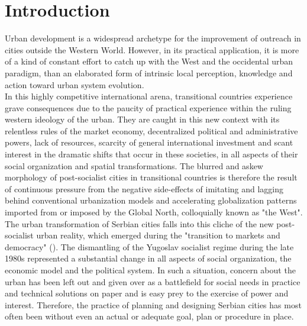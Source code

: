 \documentclass[11pt]{report}
\begin{document}

\chapter{Introduction}

Urban development is a widespread archetype for the improvement of outreach in cities outside the Western World. However, in its practical application, it is more of a kind of constant effort to catch up with the West and the occidental urban paradigm, than an elaborated form of intrinsic local perception, knowledge and action toward urban system evolution. 
\\

In this highly competitive international arena, transitional countries experience grave consequences due to the paucity of practical experience within the ruling western ideology of the urban. They are caught in this new context with its relentless rules of the market economy, decentralized political and administrative powers, lack of resources, scarcity of general international investment and scant interest in the dramatic shifts that occur in these societies, in all aspects of their social organization and spatial transformations. The blurred and askew morphology of post-socialist cities in transitional countries is therefore the result of continuous pressure from the negative side-effects of imitating and lagging behind conventional urbanization models and accelerating globalization patterns imported from or imposed by the Global North, colloquially  known as "the West".
\\

The urban transformation of Serbian cities falls into this cliche of the new post-socialist urban reality, which emerged during the "transition to markets and democracy" (\href{tsenkova}{\citealt{tsenkova_urban_2006}}). 
The dismantling of the Yugoslav socialist regime during the late 1980s represented a substantial change in all aspects of social organization, the economic model and the political system.
In such a situation, concern about the urban has been left out and given over as a battlefield for social needs in practice and technical solutions on paper and is easy prey to the exercise of power and interest. Therefore, the practice of planning and designing Serbian cities has most often been without even an actual or adequate goal, plan or procedure in place.
\\
\end{document}

